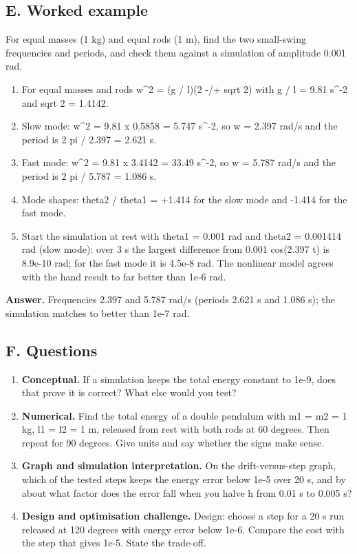 \documentclass[11pt,a4paper]{article}
\begin{document}
\subsection*{E. Worked example}
For equal masses (1 kg) and equal rods (1 m), find the two small-swing frequencies and periods, and check them against a simulation of amplitude 0.001 rad.
\begin{enumerate}[nosep]
\item For equal masses and rods w\textasciicircum{}2 = (g / l)(2 -/+ sqrt 2) with g / l = 9.81 s\textasciicircum{}-2 and sqrt 2 = 1.4142.
\item Slow mode: w\textasciicircum{}2 = 9.81 x 0.5858 = 5.747 s\textasciicircum{}-2, so w = 2.397 rad/s and the period is 2 pi / 2.397 = 2.621 s.
\item Fast mode: w\textasciicircum{}2 = 9.81 x 3.4142 = 33.49 s\textasciicircum{}-2, so w = 5.787 rad/s and the period is 2 pi / 5.787 = 1.086 s.
\item Mode shapes: theta2 / theta1 = +1.414 for the slow mode and -1.414 for the fast mode.
\item Start the simulation at rest with theta1 = 0.001 rad and theta2 = 0.001414 rad (slow mode): over 3 s the largest difference from 0.001 cos(2.397 t) is 8.9e-10 rad; for the fast mode it is 4.5e-8 rad. The nonlinear model agrees with the hand result to far better than 1e-6 rad.
\end{enumerate}
\textbf{Answer.} Frequencies 2.397 and 5.787 rad/s (periods 2.621 s and 1.086 s); the simulation matches to better than 1e-7 rad.

\subsection*{F. Questions}
\begin{enumerate}[nosep]
\item \textbf{Conceptual.} If a simulation keeps the total energy constant to 1e-9, does that prove it is correct? What else would you test?
\item \textbf{Numerical.} Find the total energy of a double pendulum with m1 = m2 = 1 kg, l1 = l2 = 1 m, released from rest with both rods at 60 degrees. Then repeat for 90 degrees. Give units and say whether the signs make sense.
\item \textbf{Graph and simulation interpretation.} On the drift-versus-step graph, which of the tested steps keeps the energy error below 1e-5 over 20 s, and by about what factor does the error fall when you halve h from 0.01 s to 0.005 s?
\item \textbf{Design and optimisation challenge.} Design: choose a step for a 20 s run released at 120 degrees with energy error below 1e-6. Compare the cost with the step that gives 1e-5. State the trade-off.
\end{enumerate}
\end{document}
